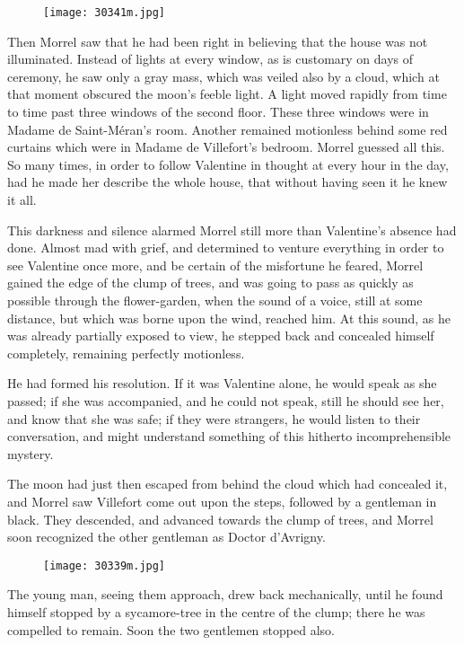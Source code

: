 \begin{figure}[ht]
\texttt{[image: 30341m.jpg]}
\end{figure}

Then Morrel saw that he had been right in believing that the house was
not illuminated. Instead of lights at every window, as is customary on
days of ceremony, he saw only a gray mass, which was veiled also by a
cloud, which at that moment obscured the moon’s feeble light. A light
moved rapidly from time to time past three windows of the second floor.
These three windows were in Madame de Saint-Méran’s room. Another
remained motionless behind some red curtains which were in Madame de
Villefort’s bedroom. Morrel guessed all this. So many times, in order
to follow Valentine in thought at every hour in the day, had he made
her describe the whole house, that without having seen it he knew it
all.

This darkness and silence alarmed Morrel still more than Valentine’s
absence had done. Almost mad with grief, and determined to venture
everything in order to see Valentine once more, and be certain of the
misfortune he feared, Morrel gained the edge of the clump of trees, and
was going to pass as quickly as possible through the flower-garden,
when the sound of a voice, still at some distance, but which was borne
upon the wind, reached him. At this sound, as he was already partially
exposed to view, he stepped back and concealed himself completely,
remaining perfectly motionless.

He had formed his resolution. If it was Valentine alone, he would speak
as she passed; if she was accompanied, and he could not speak, still he
should see her, and know that she was safe; if they were strangers, he
would listen to their conversation, and might understand something of
this hitherto incomprehensible mystery.

The moon had just then escaped from behind the cloud which had
concealed it, and Morrel saw Villefort come out upon the steps,
followed by a gentleman in black. They descended, and advanced towards
the clump of trees, and Morrel soon recognized the other gentleman as
Doctor d’Avrigny.

\begin{figure}[ht]
\texttt{[image: 30339m.jpg]}
\end{figure}

The young man, seeing them approach, drew back mechanically, until he
found himself stopped by a sycamore-tree in the centre of the clump;
there he was compelled to remain. Soon the two gentlemen stopped also.

